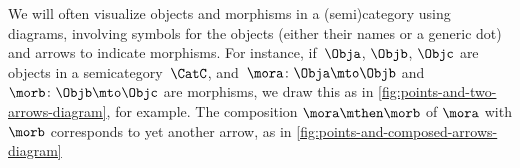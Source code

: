 \begin{marginfigure}
    \begin{center}
    \end{center}
    \caption{}
    \label{fig:points-and-two-arrows-diagram}
\end{marginfigure}

\begin{marginfigure}
    \begin{center}
    \end{center}
    \caption{}
    \label{fig:points-and-composed-arrows-diagram}
\end{marginfigure}

We will often visualize objects and morphisms in a (semi)category using diagrams, involving symbols for the objects (either their names or a generic dot) and arrows to indicate morphisms.
For instance, if~$\Obja$, $\Objb$, $\Objc$ are objects in a semicategory~$\CatC$, and~$\mora\colon \Obja \mto \Objb$ and $\morb\colon \Objb \mto \Objc$ are morphisms, we draw this as in \cref{fig:points-and-two-arrows-diagram}, for example.
The composition $\mora \mthen \morb$ of $\mora$ with $\morb$ corresponds to yet another arrow, as in \cref{fig:points-and-composed-arrows-diagram}


